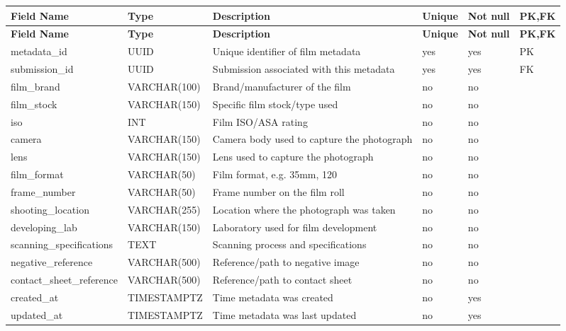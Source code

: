 \vspace{0.5em}
\renewcommand{\arraystretch}{1.15}
\setlength{\tabcolsep}{4pt}
\small
\begin{longtable}{|>{\raggedright\arraybackslash}p{}|>{\raggedright\arraybackslash}p{}|>{\raggedright\arraybackslash}p{}|>{\centering\arraybackslash}p{}|>{\centering\arraybackslash}p{}|>{\centering\arraybackslash}p{}|}
\hline
\textbf{Field Name} & \textbf{Type} & \textbf{Description} & \textbf{Unique} & \textbf{Not null} & \textbf{PK,FK} \\
\hline
\endfirsthead
\textbf{Field Name} & \textbf{Type} & \textbf{Description} & \textbf{Unique} & \textbf{Not null} & \textbf{PK,FK} \\
\hline
\endhead
metadata\_id & UUID & Unique identifier of film metadata & yes & yes & PK \\
\hline
submission\_id & UUID & Submission associated with this metadata & yes & yes & FK \\
\hline
film\_brand & VARCHAR(100) & Brand/manufacturer of the film & no & no & \\
\hline
film\_stock & VARCHAR(150) & Specific film stock/type used & no & no & \\
\hline
iso & INT & Film ISO/ASA rating & no & no & \\
\hline
camera & VARCHAR(150) & Camera body used to capture the photograph & no & no & \\
\hline
lens & VARCHAR(150) & Lens used to capture the photograph & no & no & \\
\hline
film\_format & VARCHAR(50) & Film format, e.g. 35mm, 120 & no & no & \\
\hline
frame\_number & VARCHAR(50) & Frame number on the film roll & no & no & \\
\hline
shooting\_location & VARCHAR(255) & Location where the photograph was taken & no & no & \\
\hline
developing\_lab & VARCHAR(150) & Laboratory used for film development & no & no & \\
\hline
scanning\_specifications & TEXT & Scanning process and specifications & no & no & \\
\hline
negative\_reference & VARCHAR(500) & Reference/path to negative image & no & no & \\
\hline
contact\_sheet\_reference & VARCHAR(500) & Reference/path to contact sheet & no & no & \\
\hline
created\_at & TIMESTAMPTZ & Time metadata was created & no & yes & \\
\hline
updated\_at & TIMESTAMPTZ & Time metadata was last updated & no & yes & \\
\hline
\end{longtable}

